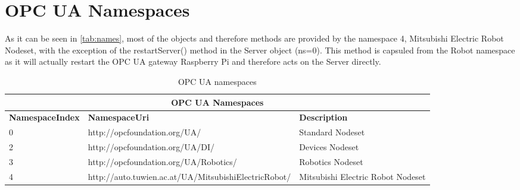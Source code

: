 \documentclass{article}
\begin{document}
\section{OPC UA Namespaces}
As it can be seen in \autoref{tab:names}, most of the objects and therefore methods are provided by the namespace 4, Mitsubishi Electric Robot Nodeset, with the exception of the restartServer() method in the Server object (ns=0). This method is capsuled from the Robot namespace as it will actually restart the OPC UA gateway Raspberry Pi and therefore acts on the Server directly.
\begin{table}[H]
	\setlength\extrarowheight{4pt}
	\small
	\begin{tabularx}{\textwidth}{|p{3cm}|p{8cm}|X|}
		\hline
		\multicolumn{3}{|c|}{\bf \color{black} \large OPC UA Namespaces}\\
		\hline\hline
		\bf NamespaceIndex &\bf NamespaceUri & \bf Description \\
		\hline\hline
		0 & http://opcfoundation.org/UA/ & Standard Nodeset\\ \hline
		2 & http://opcfoundation.org/UA/DI/ & Devices Nodeset\\ \hline
		3 & http://opcfoundation.org/UA/Robotics/ & Robotics Nodeset\\ \hline
		4 & http://auto.tuwien.ac.at/UA/MitsubishiElectricRobot/ & Mitsubishi Electric Robot Nodeset\\ \hline
	\end{tabularx}
	\caption{OPC UA namespaces}
	\label{tab:names}
\end{table}
\end{document}
